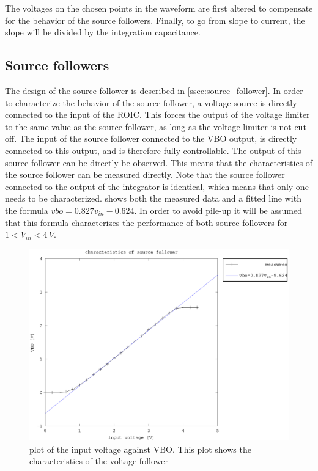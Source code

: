 The voltages on the chosen points in the waveform are first altered to compensate for the behavior of the source followers. Finally, to go from slope to current, the slope will be divided by the integration capacitance. 



\subsection{Source followers}\label{ssec:dynamic_source_followers}
The design of the source follower is described in \cref{ssec:source_follower}. In order to characterize the behavior of the source follower, a voltage source is directly connected to the input of the ROIC. This forces the output of the voltage limiter to the same value as the source follower, as long as the voltage limiter is not cut-off. The input of the source follower connected to the VBO output, is directly connected to this output, and is therefore fully controllable. The output of this source follower can be directly be observed. This means that the characteristics of the source follower can be measured directly. Note that the source follower connected to the output of the integrator is identical, which means that only one needs to be characterized.  shows both the measured data and a fitted line with the formula $vbo=0.827v_{in}-0.624$. In order to avoid pile-up it will be assumed that this formula characterizes the performance of both source followers for $1<V_{in}<4\,V$.

\begin{figure}[h]
        \centering
            \includegraphics[width=\textwidth]{fig/source_follower.eps}
            \caption[]
                {plot of the input voltage against VBO. This plot shows the characteristics of the voltage follower}    
                \label{fig:source_follower}
        \end{figure}


